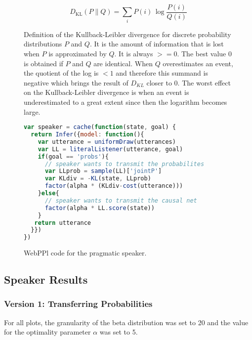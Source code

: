 \begin{figure}[ht]
\begin{equation}
D_{\mathrm {KL} }(P\|Q)= \sum _{i}P(i)\,\log {\frac {P(i)}{Q(i)}}
\end{equation}
\caption{Definition of the Kullback-Leibler divergence for discrete probability distributions $P$ and $Q$. It is the amount of information that is lost when $P$ is approximated by $Q$. It is always $>=0$. The best value 0 is obtained if $P$ and $Q$ are identical. When $Q$ overestimates an event, the quotient of the log is $<1$ and therefore this summand is negative which brings the result of $D_{KL}$ closer to 0. The worst effect on the Kullback-Leibler divergence is when an event is underestimated to a great extent since then the logarithm becomes large.}
\label{eq:KLDiv}
\end{figure}

\begin{figure}[ht]
\begin{minipage}{\linewidth}
\begin{lstlisting}[language=javascript]
var speaker = cache(function(state, goal) {
  return Infer({model: function(){
    var utterance = uniformDraw(utterances)
    var LL = literalListener(utterance, goal)  
    if(goal == 'probs'){
      // speaker wants to transmit the probabilites
      var LLprob = sample(LL)['jointP']
      var KLdiv = -KL(state, LLprob)
      factor(alpha * (KLdiv-cost(utterance)))
    }else{
      // speaker wants to transmit the causal net
      factor(alpha * LL.score(state))
    }
   return utterance
  }})
})
\end{lstlisting}
\caption{WebPPl code for the pragmatic speaker.}
\label{code:speaker}
\end{minipage}
\end{figure}

\FloatBarrier
\subsection*{Speaker Results}
\subsubsection*{Version 1: Transferring Probabilities}
For all plots, the granularity of the beta distribution was set to 20 and the value for the optimality parameter $\alpha$ was set to 5.

